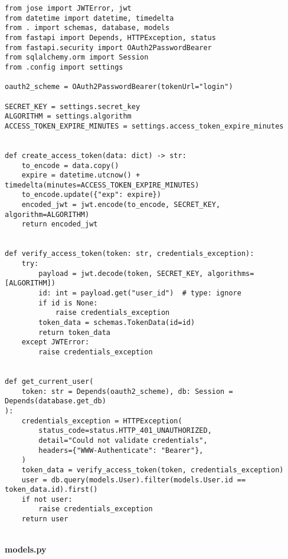 \begin{Verbatim}[breaklines=true, breakanywhere=true]
from jose import JWTError, jwt
from datetime import datetime, timedelta
from . import schemas, database, models
from fastapi import Depends, HTTPException, status
from fastapi.security import OAuth2PasswordBearer
from sqlalchemy.orm import Session
from .config import settings

oauth2_scheme = OAuth2PasswordBearer(tokenUrl="login")

SECRET_KEY = settings.secret_key
ALGORITHM = settings.algorithm
ACCESS_TOKEN_EXPIRE_MINUTES = settings.access_token_expire_minutes


def create_access_token(data: dict) -> str:
    to_encode = data.copy()
    expire = datetime.utcnow() + timedelta(minutes=ACCESS_TOKEN_EXPIRE_MINUTES)
    to_encode.update({"exp": expire})
    encoded_jwt = jwt.encode(to_encode, SECRET_KEY, algorithm=ALGORITHM)
    return encoded_jwt


def verify_access_token(token: str, credentials_exception):
    try:
        payload = jwt.decode(token, SECRET_KEY, algorithms=[ALGORITHM])
        id: int = payload.get("user_id")  # type: ignore
        if id is None:
            raise credentials_exception
        token_data = schemas.TokenData(id=id)
        return token_data
    except JWTError:
        raise credentials_exception


def get_current_user(
    token: str = Depends(oauth2_scheme), db: Session = Depends(database.get_db)
):
    credentials_exception = HTTPException(
        status_code=status.HTTP_401_UNAUTHORIZED,
        detail="Could not validate credentials",
        headers={"WWW-Authenticate": "Bearer"},
    )
    token_data = verify_access_token(token, credentials_exception)
    user = db.query(models.User).filter(models.User.id == token_data.id).first()
    if not user:
        raise credentials_exception
    return user

\end{Verbatim}

\
\\
\textbf{models.py}

